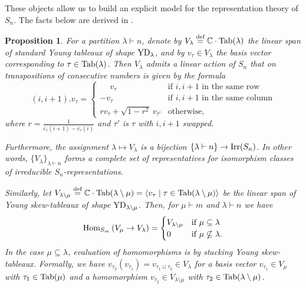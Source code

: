\documentclass{amsart}
\newtheorem{proposition}[conjecture]{Proposition}
\newcommand{\defeq}{\stackrel{\tn{def}}{=}}
\newcommand{\Hom}[3][]{\tn{Hom}_{#1}\left(#2\to #3\right)}
\newcommand{\tn}{\textnormal}
\begin{document}
These objects allow us to build an explicit model for the representation theory of $S_n$. The facts below are derived in \cite{new_approach_rep_theory_sym_gps_OkounkovVershik96}.
\begin{proposition}\label{prop:repSn_OV}
For a partition $\lambda\vdash n$, denote by $V_\lambda\defeq\mathbb{C}\cdot\tn{Tab}(\lambda)$ the linear span of standard Young tableaux of shape $\tn{YD}_\lambda$, and by $v_\tau\in V_\lambda$ the basis vector corresponding to $\tau\in\tn{Tab}(\lambda)$. Then $V_\lambda$ admits a linear action of $S_n$ that on transpositions of consecutive numbers is given by the formula
\begin{equation*}
(i,i+1).v_\tau=\begin{cases}\phantom{-}v_\tau&\text{if }i,i+1\text{ in the same row}\\-v_\tau&\text{if }i,i+1\text{ in the same column}\\rv_\tau+\sqrt{1-r^2}\:v_{\tau'}&\text{otherwise},\end{cases}
\end{equation*}
where $r=\frac{1}{c_\tau(i+1)-c_\tau(i)}$ and $\tau'$ is $\tau$ with $i,i+1$ swapped.

Furthermore, the assignment $\lambda\mapsto V_\lambda$ is a bijection $\{\lambda\vdash n\}\to\tn{Irr}(S_n)$. In other words, $\{V_\lambda\}_{\lambda\vdash n}$ forms a complete set of representatives for isomorphism classes of irreducible $S_n$-representations.

Similarly, let $V_{\lambda\setminus\mu}\defeq\mathbb{C}\cdot\tn{Tab}(\lambda\setminus\mu)=\langle v_\tau\mid\tau\in\tn{Tab}(\lambda\setminus\mu)\rangle$ be the linear span of Young skew-tableaux of shape $\tn{YD}_{\lambda\setminus\mu}$. Then, for $\mu\vdash m$ and $\lambda\vdash n$ we have
\begin{equation*}
\Hom[S_m]{V_\mu}{V_\lambda}=\begin{cases}V_{\lambda\setminus\mu}&\text{if }\mu\subseteq\lambda\\0&\text{if }\mu\nsubseteq\lambda.\end{cases}
\end{equation*}
In the case $\mu\subseteq\lambda$, evaluation of homomorphisms is by stacking Young skew-tableaux. Formally, we have $v_{\tau_2}(v_{\tau_1})=v_{\tau_1\sqcup\tau_2}\in V_\lambda$ for a basis vector $v_{\tau_1}\in V_\mu$ with $\tau_1\in\tn{Tab}(\mu)$ and a homomorphism $v_{\tau_2}\in V_{\lambda\setminus\mu}$ with $\tau_2\in\tn{Tab}(\lambda\setminus\mu)$.
\end{proposition}
\end{document}
